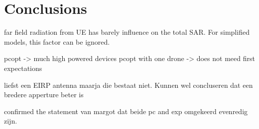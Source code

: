 \chapter{Conclusions}
\label{chap:conclusions}

far field radiation from UE has barely influence on the total SAR. For simplified models, this factor can be ignored.

pcopt -> much high powered devices
pcopt with one drone -> does not meed first expectations

liefst een EIRP antenna maarja die bestaat niet. Kunnen wel concluseren dat een bredere apperture beter is

confirmed the statement van margot dat beide pc and exp omgekeerd evenredig zijn.